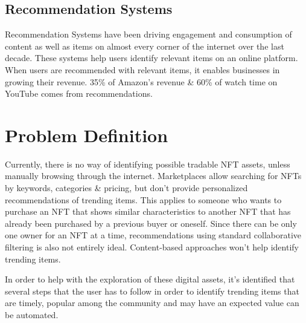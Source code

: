 \documentclass[a4paper, 12pt, oneside]{report}
\begin{document}
\section{Recommendation Systems}
Recommendation Systems have been driving engagement and consumption of content as well as items on almost every corner of the internet over the last decade.
These systems help users identify relevant items on an online platform. When users are recommended with relevant items, it enables businesses in growing their revenue. 35\% of Amazon’s revenue \autocite{naumov_deep_2019} \& 60\% of watch time on YouTube \autocite{noauthor_recommendations_nodate} comes from recommendations.







\chapter{Problem Definition}
Currently, there is no way of identifying possible tradable NFT assets, unless manually browsing through the internet. 
Marketplaces allow searching for NFTs by keywords, categories \& pricing, but don't provide personalized recommendations of trending items.
This applies to someone who wants to purchase an NFT that shows similar characteristics to another NFT that has already been purchased by a previous buyer or oneself. Since there can be only one owner for an NFT at a time, recommendations using standard collaborative filtering is also not entirely ideal. Content-based approaches won't help identify trending items.

\bigbreak
In order to help with the exploration of these digital assets, it's identified that several steps that the user has to follow in order to identify trending items that are timely, popular among the community and may have an expected value can be automated. 
\end{document}
